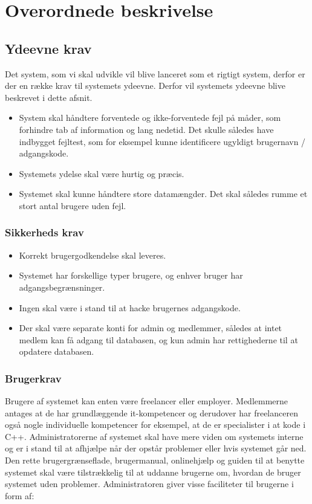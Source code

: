 \chapter{Overordnede beskrivelse}

\section{Ydeevne krav}
Det system, som vi skal udvikle vil blive lanceret som et rigtigt system, derfor er der en række krav til systemets ydeevne. Derfor vil systemets ydeevne blive beskrevet i dette afsnit.   
\begin{itemize}  
     \item System skal håndtere forventede og ikke-forventede fejl på måder, som forhindre tab af information og lang nedetid. Det skulle således have indbygget fejltest, som for eksempel kunne identificere ugyldigt brugernavn / adgangskode.
     \item Systemets ydelse skal være hurtig og præcis.
     \item Systemet skal kunne håndtere store datamængder. Det skal således rumme et stort antal brugere uden fejl.
\end{itemize}

\subsection{Sikkerheds krav}
\begin{itemize}  
    \item Korrekt brugergodkendelse skal leveres.
    \item Systemet har forskellige typer brugere, og enhver bruger har adgangsbegrænsninger.
    \item Ingen skal være i stand til at hacke brugernes adgangskode.
    \item Der skal være separate konti for admin og medlemmer, således at intet medlem kan få adgang til databasen, og kun admin har rettighederne til at opdatere databasen.
\end{itemize}

\subsection{Brugerkrav}
Brugere af systemet kan enten være freelancer eller employer.  Medlemmerne antages at de har grundlæggende it-kompetencer og derudover har freelanceren også nogle individuelle kompetencer for eksempel, at de er specialister i at kode i C++. Administratorerne af systemet skal have mere viden om systemets interne og er i stand til at afhjælpe når der opstår problemer eller hvis systemet går ned. Den rette brugergrænseflade, brugermanual, onlinehjælp og guiden til at benytte systemet skal være tilstrækkelig til at uddanne brugerne om, hvordan de bruger systemet uden problemer. 
Administratoren giver visse faciliteter til brugerne i form af:


